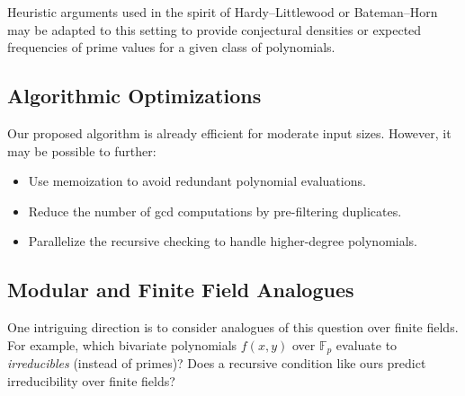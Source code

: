 \documentclass[a4paper,11pt]{article}
\begin{document}
	Heuristic arguments used in the spirit of Hardy–Littlewood or Bateman–Horn may be adapted to this setting to provide conjectural densities or expected frequencies of prime values for a given class of polynomials.
	
	\subsection*{Algorithmic Optimizations}
	
	Our proposed algorithm is already efficient for moderate input sizes. However, it may be possible to further:
	\begin{itemize}
		\item Use memoization to avoid redundant polynomial evaluations.
		\item Reduce the number of gcd computations by pre-filtering duplicates.
		\item Parallelize the recursive checking to handle higher-degree polynomials.
	\end{itemize}
	
	\subsection*{Modular and Finite Field Analogues}
	
	One intriguing direction is to consider analogues of this question over finite fields. For example, which bivariate polynomials $f(x,y)$ over $\mathbb{F}_p$ evaluate to \emph{irreducibles} (instead of primes)? Does a recursive condition like ours predict irreducibility over finite fields?
	
	
	
	
\end{document}
